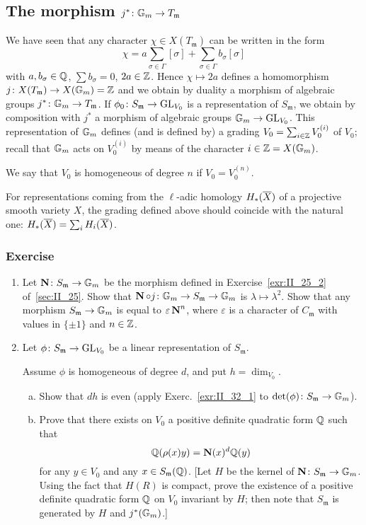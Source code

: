 \subsection{The morphism \texorpdfstring{$j^* \colon \mathbb{G}_m \to
T_{\mathfrak{m}}$}{j*: Gm -> Tm}}
We have seen that any character $\chi \in X(T_\mathfrak{m})$ can be written in 
the form
\[
	\chi = a \sum_{\sigma \in \Gamma} [\sigma] + \sum_{\sigma \in \Gamma} 
	b_{\sigma}[\sigma]
\]
with $a, b_\sigma \in \mathbb{Q}$, $\sum b_{\sigma} = 0$, $2a \in \mathbb{Z}$. Hence $\chi 
\mapsto 2a$ defines a homomorphism $j \colon X(T_\mathfrak{m}) \to X(\mathbb{G}_m) = 
\mathbb{Z}$ and we obtain by duality a morphism of algebraic groups $j^{*} \colon \mathbb{G}_m 
\to T_\mathfrak{m}$. If $\phi_0 \colon S_\mathfrak{m} \to \operatorname{GL}_{V_0}$ is a 
representation of $S_\mathfrak{m}$, we obtain by composition with $j^{*}$ a 
morphism of algebraic groups $\mathbb{G}_m \to \operatorname{GL}_{V_0}$. This representation of 
$\mathbb{G}_m$ defines (and is defined by) a grading $V_0 = \sum_{i \in \mathbb{Z}} V_0^{(i)}$ 
of $V_0$; recall that $\mathbb{G}_m$ acts on $V_0^{(i)}$ by means of the character $i 
\in \mathbb{Z} = X(\mathbb{G}_m)$.

We say that $V_0$ is homogeneous of degree $n$ if $V_0 = V_0^{(n)}$.
\dpage
\begin{obs}
For representations coming from the $\ell$-adic homology $H_{*}(\overline{X})$ of 
a projective smooth variety $X$, the grading defined above should coincide with 
the natural one: $H_{*}(\overline{X}) = \sum_i H_i(\overline{X})$.
\end{obs}
\subsubsection*{Exercise}
\begin{enumerate}
\item\label{exr:II_32_1} Let $\operatorname{\mathbf{N}} \colon S_\mathfrak{m} \to \mathbb{G}_m$ be the morphism
	defined in Exercise~\ref{exr:II_25_2} of~\ref{sec:II_25}. Show
	that $\operatorname{\mathbf{N}} \circ j \colon \mathbb{G}_m \to S_\mathfrak{m} \to
	\mathbb{G}_m$ is $\lambda \mapsto \lambda^2$.  Show that any morphism
	$S_\mathfrak{m} \to \mathbb{G}_m$ is equal to
	$\varepsilon\operatorname{\mathbf{N}}^{n}$, where $\varepsilon$ is a character
	of $C_\mathfrak{m}$ with values in $\{\pm 1\}$ and $n \in \mathbb{Z}$.
\item Let $\phi \colon S_\mathfrak{m} \to \operatorname{GL}_{V_0}$ be a linear
	representation of $S_\mathfrak{m}$.
	
	Assume $\phi$ is homogeneous of degree $d$, and put $h = \dim_{V_0}$.
	\begin{enumerate}[a)]
	\item Show that $dh$ is even (apply Exerc.~\ref{exr:II_32_1} to
		$\det(\phi) \colon S_\mathfrak{m} \to \mathbb{G}_m$).
	\item Prove that there exists on $V_0$ a positive definite quadratic
		form $\mathbb{Q}$ such that \[ \mathbb{Q}(\rho(x)y) = \operatorname{\mathbf{N}}(x)^d\mathbb{Q}(y) \] for
		any $y \in V_0$ and any $x \in S_\mathfrak{m}(\mathbb{Q})$. [Let $H$ be
		the kernel of $\operatorname{\mathbf{N}} \colon S_\mathfrak{m} \to \mathbb{G}_m$. Using
		the fact that $H(R)$ is compact, prove the existence of a
		positive definite quadratic form $\mathbb{Q}$ on $V_0$ invariant by
		$H$; then note that $S_\mathfrak{m}$ is generated by $H$ and
		$j^{*}(\mathbb{G}_m)$.] 
	\end{enumerate}
\end{enumerate}

